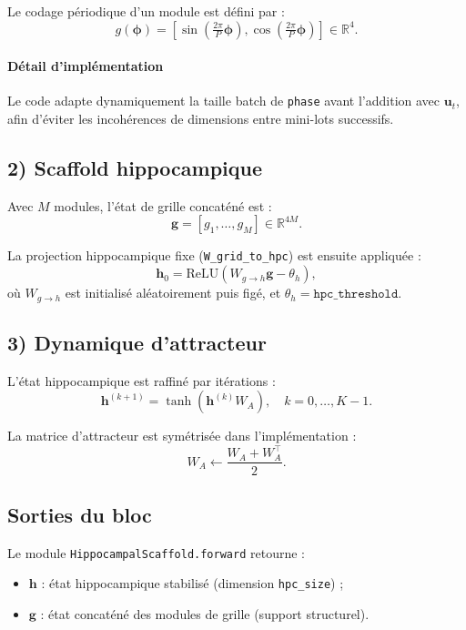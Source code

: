 \documentclass[12pt,a4paper]{article}
\begin{document}
Le codage périodique d'un module est défini par :
\begin{equation}
g(\boldsymbol{\phi})=
\left[
\sin\!\left(\tfrac{2\pi}{P}\boldsymbol{\phi}\right),
\cos\!\left(\tfrac{2\pi}{P}\boldsymbol{\phi}\right)
\right]\in\mathbb{R}^{4}.
\end{equation}

\paragraph{Détail d'implémentation}
Le code adapte dynamiquement la taille batch de \texttt{phase} avant l'addition avec $\mathbf{u}_t$, afin d'éviter les incohérences de dimensions entre mini-lots successifs.

\subsection{2) Scaffold hippocampique}
Avec $M$ modules, l'état de grille concaténé est :
\begin{equation}
\mathbf{g} = [g_1,\dots,g_M] \in \mathbb{R}^{4M}.
\end{equation}

La projection hippocampique fixe (\texttt{W\_grid\_to\_hpc}) est ensuite appliquée :
\begin{equation}
\mathbf{h}_0 = \mathrm{ReLU}(W_{g\to h}\mathbf{g}-\theta_h),
\end{equation}
où $W_{g\to h}$ est initialisé aléatoirement puis figé, et $\theta_h=\texttt{hpc\_threshold}$.

\subsection{3) Dynamique d'attracteur}
L'état hippocampique est raffiné par itérations :
\begin{equation}
\mathbf{h}^{(k+1)} = \tanh\!\left(\mathbf{h}^{(k)} W_A\right), \quad k=0,\dots,K-1.
\end{equation}

La matrice d'attracteur est symétrisée dans l'implémentation :
\begin{equation}
W_A \leftarrow \frac{W_A + W_A^\top}{2}.
\end{equation}

\subsection{Sorties du bloc}
Le module \texttt{HippocampalScaffold.forward} retourne :
\begin{itemize}
    \item $\mathbf{h}$ : état hippocampique stabilisé (dimension \texttt{hpc\_size}) ;
    \item $\mathbf{g}$ : état concaténé des modules de grille (support structurel).
\end{itemize}
\end{document}
